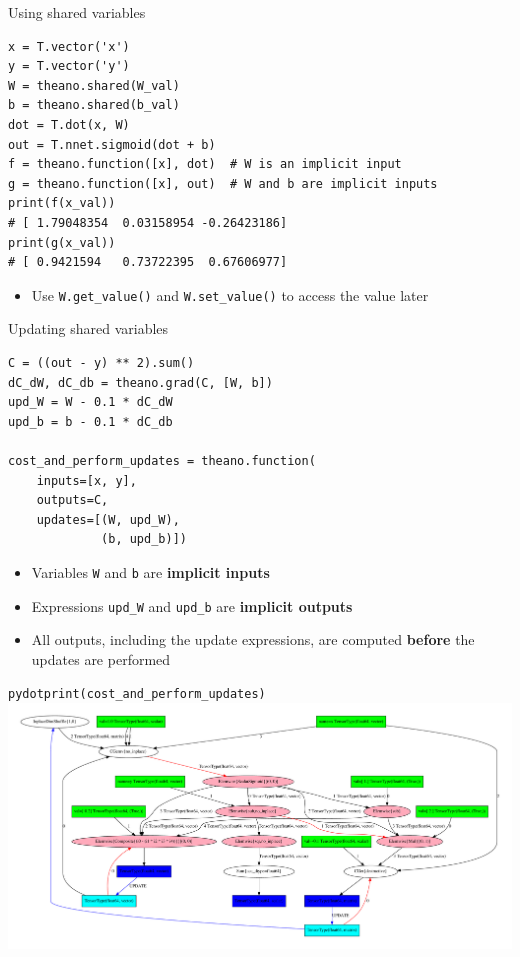 \documentclass[a4paper,9pt]{beamer}
\begin{document}
\begin{frame}[fragile]{Using shared variables}
  \begin{verbatim}
x = T.vector('x')
y = T.vector('y')
W = theano.shared(W_val)
b = theano.shared(b_val)
dot = T.dot(x, W)
out = T.nnet.sigmoid(dot + b)
f = theano.function([x], dot)  # W is an implicit input
g = theano.function([x], out)  # W and b are implicit inputs
print(f(x_val))
# [ 1.79048354  0.03158954 -0.26423186]
print(g(x_val))
# [ 0.9421594   0.73722395  0.67606977]
  \end{verbatim}
  \begin{itemize}
    \item Use \verb|W.get_value()| and \verb|W.set_value()|
      to access the value later
  \end{itemize}
\end{frame}

\begin{frame}[fragile]{Updating shared variables}
  \begin{verbatim}
C = ((out - y) ** 2).sum()
dC_dW, dC_db = theano.grad(C, [W, b])
upd_W = W - 0.1 * dC_dW
upd_b = b - 0.1 * dC_db

cost_and_perform_updates = theano.function(
    inputs=[x, y],
    outputs=C,
    updates=[(W, upd_W),
             (b, upd_b)])
  \end{verbatim}
  \begin{itemize}
    \item Variables \verb|W| and \verb|b| are {\bf implicit inputs}
    \item Expressions \verb|upd_W| and \verb|upd_b| are {\bf implicit outputs}
    \item All outputs, including the update expressions, are computed {\bf before} the updates are performed
  \end{itemize}
\end{frame}

\begin{frame}{\tt pydotprint(cost\_and\_perform\_updates)}
  \includegraphics[width=\textwidth]{pydotprint_cost_and_perform_updates.pdf}
\end{frame}
\end{document}
